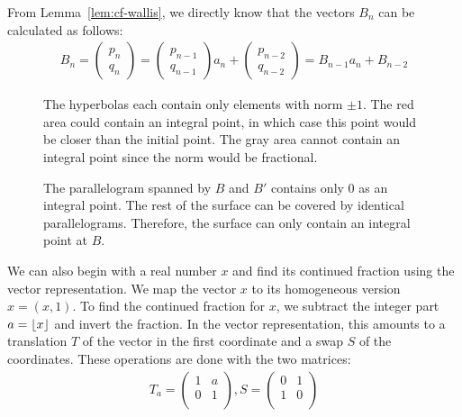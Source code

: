 From Lemma~\ref{lem:cf-wallis},
we directly know that the vectors $B_n$ can be calculated as follows:
\begin{align*}
  B_n =
  \begin{pmatrix}
    p_n \\ q_n
  \end{pmatrix}
  =
  \begin{pmatrix}
    p_{n-1} \\ q_{n-1}
  \end{pmatrix}
  a_n
  +
  \begin{pmatrix}
    p_{n-2} \\ q_{n-2}
  \end{pmatrix}
  = B_{n-1} a_n + B_{n-2}
\end{align*}

\begin{figure}[tb]
  \centering
  
  \caption{
    The hyperbolas each contain only elements with norm $±1$.
    The red area could contain an integral point, in which case this point
    would be closer than the initial point.
    The gray area cannot contain an integral point since the norm would be
    fractional.
  }
\end{figure}

\begin{figure}[tb]
  \centering
  
  \caption{
    The parallelogram spanned by $B$ and $B'$ contains only $0$ as an integral point.
    The rest of the surface can be covered by identical parallelograms.
    Therefore, the surface can only contain an integral point at $B$.
  }
\end{figure}

We can also begin with a real number $x$ and find its continued fraction using
the vector representation.
We map the vector $x$ to its homogeneous version $\hat x = (x, 1)$.
To find the continued fraction for $x$,
we subtract the integer part $a = \lfloor x\rfloor$ and invert the fraction.
In the vector representation, this amounts to a translation $T$ of the vector in
the first coordinate and a swap $S$ of the coordinates.
These operations are done with the two matrices:
\begin{align*}
  T_a = \begin{pmatrix}
    1 & a \\
    0 & 1 \\
  \end{pmatrix},
  S = \begin{pmatrix}
    0 & 1 \\
    1 & 0 \\
  \end{pmatrix}
\end{align*}

